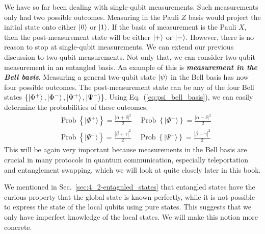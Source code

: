 We have so far been dealing with single-qubit measurements.
Such measurements only had two possible outcomes.
Measuring in the Pauli $Z$ basis would project the initial state onto either $\left| 0 \right\rangle$ or $\left| 1 \right\rangle$.
If the basis of measurement is the Pauli $X$, then the post-measurement state will be either $\left| + \right\rangle$ or $\left| - \right\rangle$.
However, there is no reason to stop at single-qubit measurements.
We can extend our previous discussion to two-qubit measurements.
Not only that, we can consider two-qubit measurement in an entangled basis.
An example of this is \textbf{\emph{measurement in the Bell basis}}.
Measuring a general two-qubit state $\left| \psi \right\rangle$ in the Bell basis has now four possible outcomes.
The post-measurement state can be any of the four Bell states $\{\left| \Phi^+ \right\rangle, \left| \Phi^- \right\rangle, \left| \Psi^+ \right\rangle, \left| \Psi^- \right\rangle\}$.
Using Eq.~(\ref{eq:psi_bell_basis}), we can easily determine the probabilities of these outcomes,
\begin{equation}
    \begin{aligned}
    &\operatorname{Prob}\left\{|\Phi^{+}\rangle\right\}=\frac{|\alpha+\delta|^{2}}{2} \quad \operatorname{Prob}\left\{|\Phi^{-}\rangle\right\}=\frac{|\alpha-\delta|^{2}}{2} \\
    &\operatorname{Prob}\left\{|\Psi^{+}\rangle\right\}=\frac{|\beta+\gamma|^{2}}{2} \quad \operatorname{Prob}\left\{|\Psi^{-}\rangle\right\}=\frac{|\beta-\gamma|^{2}}{2}
    \end{aligned}
\end{equation}
This will be again very important because measurements in the Bell basis are crucial in many protocols in quantum communication, especially teleportation and entanglement swapping, which we will look at quite closely later in this book.

We mentioned in Sec.~\ref{sec:4_2-entagnled_states} that entangled states have the curious property that the global state is known perfectly, while it is not possible to express the state of the local qubits using pure states.
This suggests that we only have imperfect knowledge of the local states.
We will make this notion more concrete.

